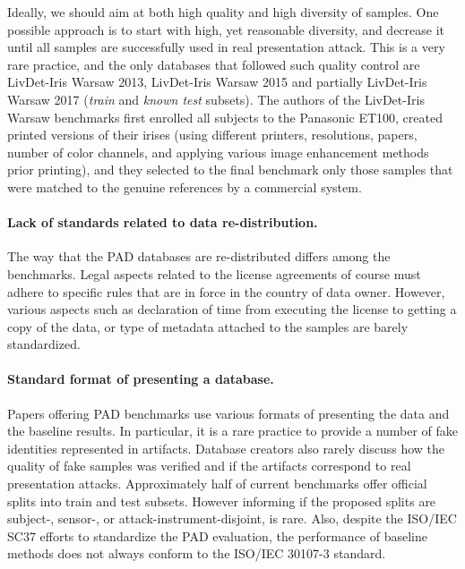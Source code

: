 \documentclass[format=acmsmall, review=false, timestamp=false]{acmart}
\begin{document}
Ideally, we should aim at both high quality and high diversity of samples. One possible approach is to start with high, yet reasonable diversity, and decrease it until all samples are successfully used in real presentation attack. This is a very rare practice, and the only databases that followed such quality control are {\sf LivDet-Iris Warsaw 2013}, {\sf LivDet-Iris Warsaw 2015} and partially {\sf LivDet-Iris Warsaw 2017} ({\it train} and {\it known test} subsets). The authors of {the} {\sf LivDet-Iris Warsaw} benchmarks first enrolled all subjects to the Panasonic ET100, created printed versions of their irises (using different printers, resolutions, papers, number of color channels, and applying various image enhancement methods prior printing), and they selected to the final benchmark only those samples that were matched to the genuine references by a commercial system.

\paragraph{Lack of standards related to data re-distribution.} The way that the PAD databases are re-distributed differs among the benchmarks. {L}egal aspects related to the license agreements {of course} must adhere to specific rules that are in force in the country of data owner. However, various aspects such as declaration of time from executing the license to getting a copy of the data, or type of metadata attached to the samples are barely standardized.

\paragraph{Standard format of presenting a database.} Papers offering PAD benchmarks use various formats of presenting the data and the baseline results. In particular, it is a rare practice to provide a number of fake identities represented in artifacts. Database creators also rarely discuss how the quality of {fake samples} was verified and if the artifacts correspond to real presentation attacks. Approximately half of current benchmarks offer official splits into train and test subsets{.} {H}owever informing if the proposed splits are subject-, sensor-, or {attack-instrument-disjoint}, is rare. Also, despite the ISO/IEC SC37 efforts to standardize the PAD evaluation, the performance of baseline methods does not always {conform to the ISO/IEC 30107-3 standard}.


\end{document}
